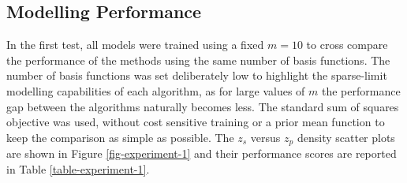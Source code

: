 \documentclass[useAMS,usenatbib,fleqn]{mn2e}
\begin{document}
\subsection{Modelling Performance}

In the first test, all models were trained using a fixed $m=10$ to cross compare the performance of the methods using the same number of basis functions. The number of basis functions was set deliberately low to highlight the sparse-limit modelling capabilities of each algorithm, as for large values of $m$ the performance gap between the algorithms naturally becomes less. The standard sum of squares objective was used, without cost sensitive training or a prior mean function to keep the comparison as simple as possible. The $z_{s}$ versus $z_{p}$ density scatter plots are shown in Figure \ref{fig-experiment-1} and their performance scores are reported in Table \ref{table-experiment-1}.
\end{document}

